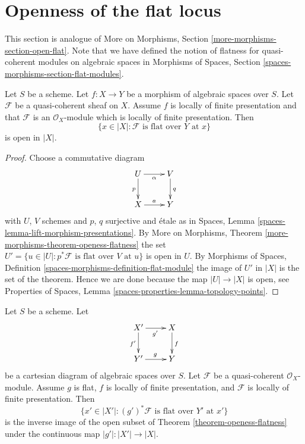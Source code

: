 \section{Openness of the flat locus}
\label{section-open-flat}

\noindent
This section is analogue of
More on Morphisms, Section \ref{more-morphisms-section-open-flat}.
Note that we have defined the notion of flatness for quasi-coherent
modules on algebraic spaces in
Morphisms of Spaces, Section \ref{spaces-morphisms-section-flat-modules}.

\begin{theorem}
\label{theorem-openess-flatness}
Let $S$ be a scheme.
Let $f : X \to Y$ be a morphism of algebraic spaces over $S$.
Let $\mathcal{F}$ be a quasi-coherent sheaf on $X$.
Assume $f$ is locally of finite presentation and that
$\mathcal{F}$ is an $\mathcal{O}_X$-module which is
locally of finite presentation. Then
$$
\{x \in |X| : \mathcal{F}\text{ is flat over }Y\text{ at }x\}
$$
is open in $|X|$.
\end{theorem}

\begin{proof}
Choose a commutative diagram
$$
\xymatrix{
U \ar[d]_p \ar[r]_\alpha &
V \ar[d]^q \\
X \ar[r]^a & Y
}
$$
with $U$, $V$ schemes and $p$, $q$ surjective and \'etale as in
Spaces, Lemma \ref{spaces-lemma-lift-morphism-presentations}.
By
More on Morphisms, Theorem \ref{more-morphisms-theorem-openess-flatness}
the set
$U' = \{u \in |U| : p^*\mathcal{F}\text{ is flat over }V\text{ at }u\}$
is open in $U$. By
Morphisms of Spaces, Definition \ref{spaces-morphisms-definition-flat-module}
the image of $U'$ in $|X|$ is the set
of the theorem. Hence we are done because the map $|U| \to |X|$ is
open, see
Properties of Spaces, Lemma \ref{spaces-properties-lemma-topology-points}.
\end{proof}

\begin{lemma}
\label{lemma-flat-locus-base-change}
Let $S$ be a scheme. Let
$$
\xymatrix{
X' \ar[r]_{g'} \ar[d]_{f'} & X \ar[d]^f \\
Y' \ar[r]^g & Y
}
$$
be a cartesian diagram of algebraic spaces over $S$.
Let $\mathcal{F}$ be a quasi-coherent $\mathcal{O}_X$-module.
Assume $g$ is flat, $f$ is locally of finite presentation,
and $\mathcal{F}$ is locally of finite presentation.
Then
$$
\{x' \in |X'| : (g')^*\mathcal{F}\text{ is flat over }Y'\text{ at }x'\}
$$
is the inverse image of the open subset of
Theorem \ref{theorem-openess-flatness}
under the continuous map $|g'| : |X'| \to |X|$.
\end{lemma}

